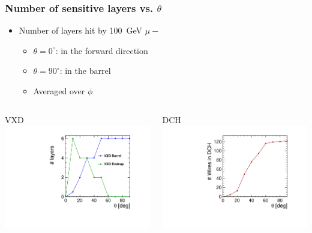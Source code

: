 \documentclass[aspectratio=169, hyperref={colorlinks=true,pdfpagelabels=false,linkcolor=black}, xcolor=dvipsnames,10pt]{beamer}
\begin{document}
\begin{frame}
	\frametitle{Number of sensitive layers vs. $\theta$}
	
	\begin{itemize}
		\item Number of layers hit by 100~GeV $\mu-$ 
		\begin{itemize}

		\item $\theta=0^{\circ}$: in the forward direction
		\item $\theta=90^{\circ}$: in the barrel
		\item Averaged over $\phi$	
		\end{itemize}
	\end{itemize}
		
	\begin{columns}	
		\begin{block}{VXD}
		\centering
		\includegraphics[width=\textwidth]{../figures/theta_nbHits_VXD.pdf}
		\end{block}
	
		\begin{block}{DCH}
		\centering
		\includegraphics[width=\textwidth]{../figures/theta_nbHits_DCH.pdf} 	
		\end{block}
	\end{columns}
	
	
\end{frame}
\end{document}

